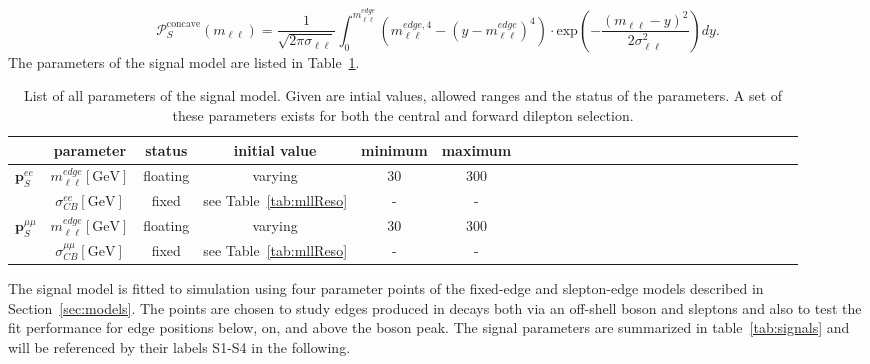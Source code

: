 \begin{equation}
 {\mathcal{P}}_{S}^{\text{concave}}(m_{\ell\ell}) = \frac{1}{\sqrt{2\pi\sigma_{\ell\ell}}} \int_{0}^{m_{\ell\ell}^{edge}} (m_{\ell\ell}^{edge,4} -(y-m_{\ell\ell}^{edge})^4) \cdot \textrm{exp}\left( -\frac{(m_{\ell\ell}-y)^2}{2\sigma_{\ell\ell}^{2}}\right) dy.
\end{equation}
The parameters of the signal model are listed in Table~\ref{tab:Fit_Par_Overview_Sig}.
\begin{table}[htbp]
\begin{center}
 \renewcommand{\arraystretch}{1.3}
 \caption{List of all parameters of the signal model. Given are intial values, allowed ranges and the status of the parameters. A set of these parameters exists for both the central and forward dilepton selection.\label{tab:Fit_Par_Overview_Sig}}
\begin{tabular}{l|c|c|c|c|ccccccccccccccccccccc}
& parameter & status & initial value & minimum & maximum \\ \hline
\multirow{2}{*}{$\mathbf{p}_{S}^{ee}$} & $m_{\ell\ell}^{edge} [\mathrm{GeV}]$ & floating & varying & 30 & 300 \\ 
& $\sigma_{CB}^{ee}  [\mathrm{GeV}]$ & fixed & see Table~\ref{tab:mllReso} & - & - \\ \hline
\multirow{2}{*}{$\mathbf{p}_{S}^{\mu\mu}$} & $m_{\ell\ell}^{edge} [\mathrm{GeV}]$ & floating & varying & 30 & 300 \\ 
& $\sigma_{CB}^{\mu\mu}  [\mathrm{GeV}]$ & fixed & see Table~\ref{tab:mllReso} & - & - \\
\end{tabular}

\end{center}
\end{table}

The signal model is fitted to simulation using four parameter points of the fixed-edge and slepton-edge models described in Section~\ref{sec:models}. The points are chosen to study edges produced in decays both via an off-shell \Z boson and sleptons and also to test the fit performance for edge positions below, on, and above the \Z boson peak. The signal parameters are summarized in table~\ref{tab:signals} and will be referenced by their labels S1-S4 in the following.

